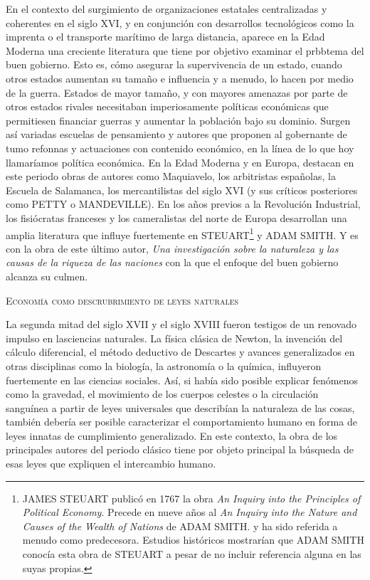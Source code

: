 \documentclass[10pt,a4paper]{article}
\begin{document}
En el contexto del surgimiento de organizaciones estatales centralizadas y coherentes en el siglo XVI, y en conjunción con desarrollos tecnológicos como la imprenta o el transporte marítimo de larga distancia, aparece en la Edad Moderna una creciente literatura que tiene por objetivo examinar el prbbtema del buen gobierno. Esto es, cómo asegurar la supervivencia de un estado, cuando otros estados aumentan su tamaño e influencia y a menudo, lo hacen por medio de la guerra. Estados de mayor tamaño, y con mayores amenazas por parte de otros estados rivales necesitaban imperiosamente políticas económicas que permitiesen financiar guerras y aumentar la población bajo su dominio. Surgen así variadas escuelas de pensamiento y autores que proponen al gobernante de tumo refonnas y actuaciones con contenido económico, en la línea de lo que hoy llamaríamos política económica. En la Edad Moderna y en Europa, destacan en este periodo obras de autores como Maquiavelo, los arbitristas españolas, la Escuela de Salamanca, los mercantilistas del siglo XVI (y sus críticos posteriores como PETTY o MANDEVILLE). En los años previos a la Revolución Industrial, los fisiócratas franceses y los cameralistas del norte de Europa desarrollan una amplia literatura que influye fuertemente en STEUART\footnote{%
    JAMES STEUART publicó en 1767 la obra \textit{An Inquiry into the Principles of Political Economy}. Precede en nueve años al \textit{An Inquiry into the Nature and Causes of the Wealth of Nations} de ADAM SMITH. y ha sido referida a menudo como predecesora. Estudios históricos mostrarían que ADAM SMITH conocía esta obra de STEUART a pesar de no incluir referencia alguna en las suyas propias.
} y ADAM SMITH. Y es con la obra de este último autor, \textit{Una investigación sobre la naturaleza y las causas de la riqueza de las naciones} con la que el enfoque del buen gobierno alcanza su culmen.

\textsc{Economía como descrubrimiento de leyes naturales}

La segunda mitad del siglo XVII y el siglo XVIII fueron testigos de un renovado impulso en lasciencias naturales. La física clásica de Newton, la invención del cálculo diferencial, el método deductivo de Descartes y avances generalizados en otras disciplinas como la biología, la astronomía o la química, influyeron fuertemente en las ciencias sociales. Así, si había sido posible explicar fenómenos como la gravedad, el movimiento de los cuerpos celestes o la circulación sanguínea a partir de leyes universales que describían la naturaleza de las cosas, también debería ser posible caracterizar el comportamiento humano en forma de leyes innatas de cumplimiento generalizado. En este contexto, la obra de los principales autores del periodo clásico tiene por objeto principal la búsqueda de esas leyes que expliquen el intercambio humano. 
\end{document}
